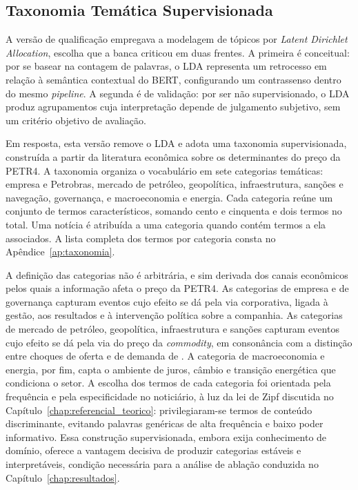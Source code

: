 \subsection{Taxonomia Temática Supervisionada}

A versão de qualificação empregava a modelagem de tópicos por \textit{Latent Dirichlet Allocation}, escolha que a banca criticou em duas frentes. A primeira é conceitual: por se basear na contagem de palavras, o LDA representa um retrocesso em relação à semântica contextual do BERT, configurando um contrassenso dentro do mesmo \textit{pipeline}. A segunda é de validação: por ser não supervisionado, o LDA produz agrupamentos cuja interpretação depende de julgamento subjetivo, sem um critério objetivo de avaliação.

Em resposta, esta versão remove o LDA e adota uma taxonomia supervisionada, construída a partir da literatura econômica sobre os determinantes do preço da PETR4. A taxonomia organiza o vocabulário em sete categorias temáticas: empresa e Petrobras, mercado de petróleo, geopolítica, infraestrutura, sanções e navegação, governança, e macroeconomia e energia. Cada categoria reúne um conjunto de termos característicos, somando cento e cinquenta e dois termos no total. Uma notícia é atribuída a uma categoria quando contém termos a ela associados. A lista completa dos termos por categoria consta no Apêndice~\ref{ap:taxonomia}.

A definição das categorias não é arbitrária, e sim derivada dos canais econômicos pelos quais a informação afeta o preço da PETR4. As categorias de empresa e de governança capturam eventos cujo efeito se dá pela via corporativa, ligada à gestão, aos resultados e à intervenção política sobre a companhia. As categorias de mercado de petróleo, geopolítica, infraestrutura e sanções capturam eventos cujo efeito se dá pela via do preço da \textit{commodity}, em consonância com a distinção entre choques de oferta e de demanda de . A categoria de macroeconomia e energia, por fim, capta o ambiente de juros, câmbio e transição energética que condiciona o setor. A escolha dos termos de cada categoria foi orientada pela frequência e pela especificidade no noticiário, à luz da lei de Zipf discutida no Capítulo~\ref{chap:referencial_teorico}: privilegiaram-se termos de conteúdo discriminante, evitando palavras genéricas de alta frequência e baixo poder informativo. Essa construção supervisionada, embora exija conhecimento de domínio, oferece a vantagem decisiva de produzir categorias estáveis e interpretáveis, condição necessária para a análise de ablação conduzida no Capítulo~\ref{chap:resultados}.

